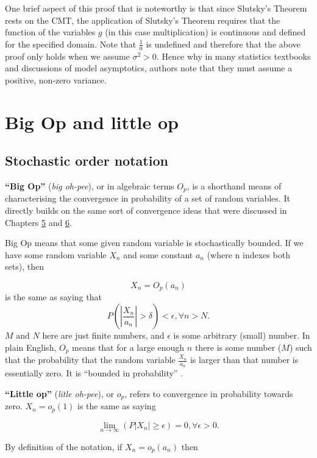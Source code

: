 \documentclass[
]{book}
\begin{document}
One brief aspect of this proof that is noteworthy is that since Slutsky's Theorem rests on the CMT, the application of Slutsky's Theorem requires that the function of the variables \(g\) (in this case multiplication) is continuous and defined for the specified domain. Note that \(\frac{1}{0}\) is undefined and therefore that the above proof only holds when we assume \(\sigma^2 > 0\). Hence why in many statistics textbooks and discussions of model asymptotics, authors note that they must assume a positive, non-zero variance.

\hypertarget{big-op-and-little-op}{%
\chapter{Big Op and little op}\label{big-op-and-little-op}}

\hypertarget{stochastic-order-notation}{%
\section{Stochastic order notation}\label{stochastic-order-notation}}

\textbf{``Big Op''} (\emph{big oh-pee}), or in algebraic terms \(O_p\), is a shorthand means of characterising the convergence in probability of a set of random variables. It directly builds on the same sort of convergence ideas that were discussed in Chapters \protect\hyperlink{wlln}{5} and \protect\hyperlink{slutsky}{6}.

Big Op means that some given random variable is stochastically bounded. If we have some random variable \(X_n\) and some constant \(a_n\) (where n indexes both sets), then

\[ X_n = O_p(a_n)\] is the same as saying that \[ P(|\frac{X_n}{a_n}| > \delta) < \epsilon, \forall n > N. \]
\(M \text{ and } N\) here are just finite numbers, and \(\epsilon\) is some arbitrary (small) number. In plain English, \(O_p\) means that for a large enough \(n\) there is some number (\(M\)) such that the probability that the random variable \(\frac{X_n}{a_n}\) is larger than that number is essentially zero. It is ``bounded in probability'' \citep[Section 2.2]{vaart_1998}.

\textbf{``Little op''} (\emph{litle oh-pee}), or \(o_p\), refers to convergence in probability towards zero. \(X_n = o_p(1)\) is the same as saying

\[ \lim_{n\to\infty} (P|X_n| \geq \epsilon) = 0, \forall\epsilon > 0. \]

By definition of the notation, if \(X_n = o_p(a_n)\) then
\end{document}

